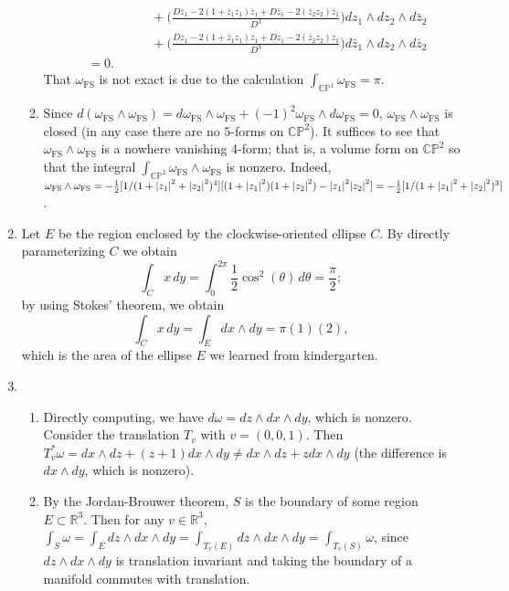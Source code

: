 \documentclass[11pt,leqno]{article}
\theoremstyle{plain}
\theoremstyle{definition}
\numberwithin{equation}{section}
\numberwithin{lem}{section}
\begin{document}
\begin{enumerate}
\begin{enumerate}
\begin{align*}
            &\hspace{5em} + \bigg(\frac{D\bar z_1-2(1+\bar z_1z_1)\bar z_1 + D\bar z_1-2(\bar z_2z_2)\bar z_1}{D^3}\bigg)dz_1\wedge dz_2\wedge d\bar z_2 \\
            &\hspace{5em} + \bigg(\frac{D z_1-2(1+\bar z_1z_1) z_1 + D z_1-2(\bar z_2z_2) z_1}{D^3}\bigg)d\bar z_1\wedge dz_2\wedge d\bar z_2\\
            &= 0.
        \end{align*}
        That $\omega_{\mathrm{FS}}$ is not exact is due to the calculation $\int_{\mathbb{CP}^1}\omega_{\mathrm{FS}} = \pi$.
        \item Since $d(\omega_{\mathrm{FS}}\wedge \omega_{\mathrm{FS}}) = d\omega_{\mathrm{FS}}\wedge \omega_{\mathrm{FS}} + (-1)^2\omega_{\mathrm{FS}}\wedge d\omega_{\mathrm{FS}} = 0$, $\omega_{\mathrm{FS}}\wedge \omega_{\mathrm{FS}}$ is closed (in any case there are no $5$-forms on $\mathbb{CP}^2$). It suffices to see that $\omega_{\mathrm{FS}}\wedge \omega_{\mathrm{FS}}$ is a nowhere vanishing $4$-form; that is, a volume form on $\mathbb{CP}^2$ so that the integral $\int_{\mathbb{CP}^2}\omega_{\mathrm{FS}}\wedge \omega_{\mathrm{FS}}$ is nonzero. Indeed, $\omega_{\mathrm{FS}}\wedge \omega_{\mathrm{FS}} = -\frac{1}{2}[1/(1+\abs{z_1}^2 + \abs{z_2}^2)^4][(1+\abs{z_1}^2)(1+\abs{z_2}^2) - \abs{z_1}^2\abs{z_2}^2] = -\frac{1}{2}[1/(1+\abs{z_1}^2 + \abs{z_2}^2)^3]$.
    \end{enumerate}
    \item Let $E$ be the region enclosed by the clockwise-oriented ellipse $C$. By directly parameterizing $C$ we obtain 
    \[\int_C x\,dy = \int_0^{2\pi}\frac{1}{2}\cos^2(\theta)\,d\theta = \frac{\pi}{2};\]
    by using Stokes' theorem, we obtain
    \[\int_C x\,dy = \int_E dx\wedge dy = \pi(1)(2),\]
    which is the area of the ellipse $E$ we learned from kindergarten.
    \item \begin{enumerate}
        \item Directly computing, we have $d\omega = dz\wedge dx\wedge dy$, which is nonzero. Consider the translation $T_v$ with $v = (0,0,1)$. Then $T_v^\ast\omega = dx\wedge dz + (z+1)dx \wedge dy\neq dx\wedge dz + zdx \wedge dy$ (the difference is $dx\wedge dy$, which is nonzero).
        \item By the Jordan-Brouwer theorem, $S$ is the boundary of some region $E\subset \mathbb R^3$. Then for any $v\in\mathbb R^3$, $\int_S\omega = \int_E dz\wedge dx\wedge dy = \int_{T_v(E)} dz\wedge dx\wedge dy = \int_{T_v(S)} \omega$, since $dz\wedge dx\wedge dy$ is translation invariant and taking the boundary of a manifold commutes with translation.

\end{enumerate}
\end{enumerate}
\end{document}
